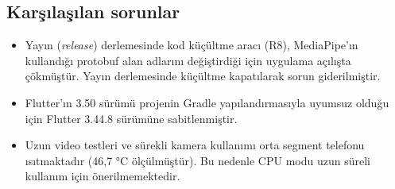 \subsection{Karşılaşılan sorunlar}

\begin{itemize}
  \item Yayın (\textit{release}) derlemesinde kod küçültme aracı (R8), MediaPipe'ın
        kullandığı protobuf alan adlarını değiştirdiği için uygulama açılışta
        çökmüştür. Yayın derlemesinde küçültme kapatılarak sorun giderilmiştir.
  \item Flutter'ın 3.50 sürümü projenin Gradle yapılandırmasıyla uyumsuz olduğu için
        Flutter 3.44.8 sürümüne sabitlenmiştir.
  \item Uzun video testleri ve sürekli kamera kullanımı orta segment telefonu
        ısıtmaktadır (46,7 °C ölçülmüştür). Bu nedenle CPU modu uzun süreli kullanım
        için önerilmemektedir.
\end{itemize}
